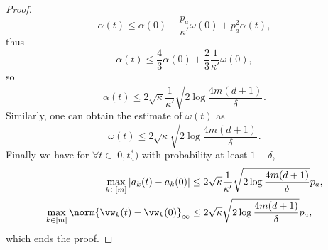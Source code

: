\documentclass{article}
\begin{document}
\begin{proof}
\begin{equation}
        \alpha(t)\leq\alpha(0)+\frac{p_a}{\kappa'}\omega(0)+p_a^2\alpha(t),
    \end{equation}
    thus
    \begin{equation}
        \alpha(t)\leq\frac{4}{3}\alpha(0)+\frac{2}{3}\frac{1}{\kappa'}\omega(0),
    \end{equation}
    so
    \begin{equation}
        \alpha(t)\leq 2\sqrt{\kappa}\frac{1}{\kappa'}\sqrt{2\log\frac{4m(d+1)}{\delta}}.
    \end{equation}
    Similarly, one can obtain the estimate of $\omega(t)$ as
    \begin{equation}
        \omega(t)\leq 2\sqrt{\kappa}\sqrt{2\log\frac{4m(d+1)}{\delta}}.
    \end{equation}
    Finally we have for $\forall t\in[0, t^*_a)$ with probability at least $1-\delta$,
    \begin{equation}
        \begin{aligned}
            \max\limits_{k\in[m]}|a_k(t) - a_k(0)|
             & \leq 2\sqrt{\kappa}\frac{1}{\kappa'}\sqrt{2\log\frac{4m(d+1)}{\delta}}p_a, \\
            \max\limits_{k\in[m]}\norm{\vw_k(t) - \vw_k(0)}_{\infty}
             & \leq 2\sqrt{\kappa}\sqrt{2\log\frac{4m(d+1)}{\delta}}p_a,
        \end{aligned}
    \end{equation}
    which ends the proof.
\end{proof}



\end{document}
